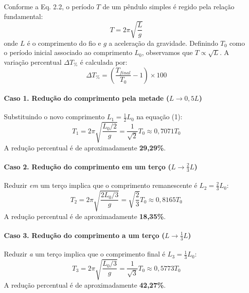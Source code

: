 Conforme a Eq. 2.2, o período $T$ de um pêndulo simples é regido pela relação fundamental:
\begin{equation}
T = 2\pi \sqrt{\frac{L}{g}}
\end{equation}
onde $L$ é o comprimento do fio e $g$ a aceleração da gravidade. Definindo $T_0$ como o período inicial associado ao comprimento $L_0$, observamos que $T \propto \sqrt{L}$. A variação percentual $\Delta T_{\%}$ é calculada por:
\begin{equation}
\Delta T_{\%} = \left( \frac{T_{final}}{T_0} - 1 \right) \times 100
\end{equation}

\paragraph{Caso 1. Redução do comprimento pela metade ($L \to 0{,}5L$)}
Substituindo o novo comprimento $L_1 = \frac{1}{2}L_0$ na equação (1):
\begin{equation}
T_1 = 2\pi \sqrt{\frac{L_0/2}{g}} = \frac{1}{\sqrt{2}} T_0 \approx 0{,}7071 T_0
\end{equation}
A redução percentual é de aproximadamente \textbf{29,29\%}.

\paragraph{Caso 2. Redução do comprimento em um terço ($L \to \frac{2}{3}L$)}
Reduzir \textit{em} um terço implica que o comprimento remanescente é $L_2 = \frac{2}{3}L_0$:
\begin{equation}
T_2 = 2\pi \sqrt{\frac{2L_0/3}{g}} = \sqrt{\frac{2}{3}} T_0 \approx 0{,}8165 T_0
\end{equation}
A redução percentual é de aproximadamente \textbf{18,35\%}.

\paragraph{Caso 3. Redução do comprimento a um terço ($L \to \frac{1}{3}L$)}
Reduzir \textit{a} um terço implica que o comprimento final é $L_3 = \frac{1}{3}L_0$:
\begin{equation}
T_3 = 2\pi \sqrt{\frac{L_0/3}{g}} = \frac{1}{\sqrt{3}} T_0 \approx 0{,}5773 T_0
\end{equation}
A redução percentual é de aproximadamente \textbf{42,27\%}.